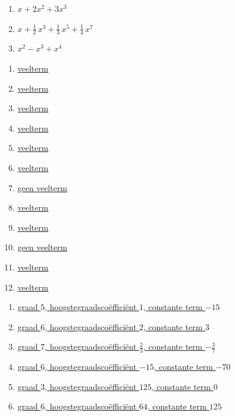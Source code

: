 \documentclass{ximera}
\begin{document}
\begin{oplossing} 
\begin{enumerate}
\item
\hyperlink{oef1.2}{$x + 2x^2 + 3x^3$}
\item
\hyperlink{oef1.2}{$x + \frac{1}{2}\,x^3 + \frac{1}{3}\,x^5 + \frac{1}{4}\,x^7$}
\item
\hyperlink{oef1.2}{$x^2 - x^3 + x^4$}
\end{enumerate}
\end{oplossing} 

\begin{oplossing} 
\begin{enumerate}
\item
\hyperlink{oef1.3}{veelterm}
\item
\hyperlink{oef1.3}{veelterm}
\item
\hyperlink{oef1.3}{veelterm}
\item
\hyperlink{oef1.3}{veelterm}
\item
\hyperlink{oef1.3}{veelterm}
\item
\hyperlink{oef1.3}{veelterm}
\item
\hyperlink{oef1.3}{geen veelterm}
\item
\hyperlink{oef1.3}{veelterm}
\item
\hyperlink{oef1.3}{veelterm}
\item
\hyperlink{oef1.3}{geen veelterm}
\item
\hyperlink{oef1.3}{veelterm}
\item
\hyperlink{oef1.3}{veelterm}
\end{enumerate}
\setcounter{enumi}{4}
\end{oplossing} 



\begin{oplossing} 
\begin{enumerate}
\item
\hyperlink{oef1.5}{graad $5$, hoogstegraadsco\"effici\"ent $1$, constante term $-15$}
\item
\hyperlink{oef1.5}{graad $6$, hoogstegraadsco\"effici\"ent $2$, constante term $3$}
\item
\hyperlink{oef1.5}{graad $7$, hoogstegraadsco\"effici\"ent $\frac{2}{3}$, constante term $-\frac{3}{7}$}
\item
\hyperlink{oef1.5}{graad $6$, hoogstegraadsco\"effici\"ent $-15$, constante term $-70$}
\item
\hyperlink{oef1.5}{graad $3$, hoogstegraadsco\"effici\"ent $125$, constante term $0$}
\item
\hyperlink{oef1.5}{graad $6$, hoogstegraadsco\"effici\"ent $64$, constante term $125$}
\end{enumerate}
\setcounter{enumi}{6}
\end{oplossing} 
\end{document}
